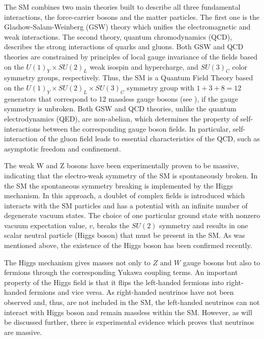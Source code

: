 The SM combines two main theories built to describe all three fundamental interactions, the force-carrier bosons and the matter particles. The first one is the Glashow-Salam-Weinberg (GSW) theory which unifies the electromagnetic and weak interactions. The second theory, quantum chromodynamics (QCD), describes the strong interactions of quarks and gluons. Both GSW and QCD theories are constrained by principles of local gauge invariance of the fields based on the $U(1)_Y\times SU(2)_{L}$ weak isospin and hypercharge, and $SU(3)_C$ color symmetry groups, respectively. Thus, the SM is a Quantum Field Theory based on the $U(1)_Y\times SU(2)_{L}\times SU(3)_C$ symmetry group with $1+3+8=12$ generators that correspond to 12 massless gauge bosons (see ), if the gauge symmetry is unbroken. 
Both GSW and QCD theories, unlike the quantum electrodynamics (QED), are non-abelian, which determines the property of self-interactions between the corresponding gauge boson fields. In particular, self-interaction of the gluon field leads to essential characteristics of the QCD, such as asymptotic freedom and confinement.

The weak W and Z bosons have been experimentally proven to be massive, indicating that the electro-weak symmetry of the SM is spontaneously broken. 
In the SM the spontaneous symmetry breaking is implemented by the Higgs mechanism. 
In this approach, a doublet of complex fields is introduced which interacts with the SM particles and has a potential with an infinite number of degenerate vacuum states. 
The choice of one particular ground state with nonzero vacuum expectation value, $v$, breaks the $SU(2)$ symmetry and results in one scalar neutral particle (Higgs boson) that must be present in the SM. As was mentioned above, the existence of the Higgs boson has been confirmed recently.

The Higgs mechanism gives masses not only to $Z$ and $W$ gauge bosons but also to fermions through the corresponding Yukawa coupling terms. 
An important property of the Higgs field is that it flips the left-handed fermions into right-handed fermions and vice versa. 
As right-handed neutrinos have not been observed and, thus, are not included in the SM, the left-handed
neutrinos can not interact with Higgs boson and remain massless within the SM. 
However, as will be discussed further, there is experimental evidence which proves that neutrinos are massive.

